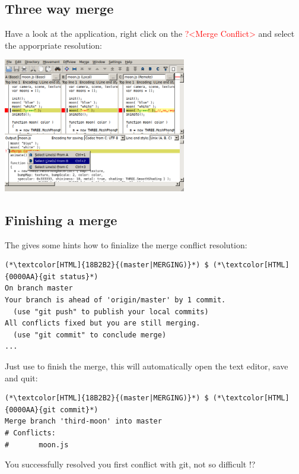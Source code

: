 \subsection{Three way merge}
\begin{frame}[fragile]
    \subslidetitle
  Have a look at the  application, right click on the \textcolor{red}{?<Merge Conflict>} and select the apporpriate resolution:
  \newline \vspace{1em}
  \centerline{\includegraphics[width=8cm]{../screen/git-mergetool-kdiff3-resolve.png}}

\end{frame}

\subsection{Finishing a merge}
\begin{frame}[fragile]
    \subslidetitle
  The  gives some hints how to finialize the merge conflict resolution:
  \begin{lstlisting}
(*\textcolor[HTML]{18B2B2}{(master|MERGING)}*) $ (*\textcolor[HTML]{0000AA}{git status}*)
On branch master
Your branch is ahead of 'origin/master' by 1 commit.
  (use "git push" to publish your local commits)
All conflicts fixed but you are still merging.
  (use "git commit" to conclude merge)
...
\end{lstlisting}

  Just use  to finish the merge, this will automatically open the text editor, save and quit:
  \begin{lstlisting}
(*\textcolor[HTML]{18B2B2}{(master|MERGING)}*) $ (*\textcolor[HTML]{0000AA}{git commit}*)
Merge branch 'third-moon' into master
# Conflicts:
#       moon.js
\end{lstlisting}
  You successfully resolved you first conflict with git, not so difficult !?

\end{frame}

